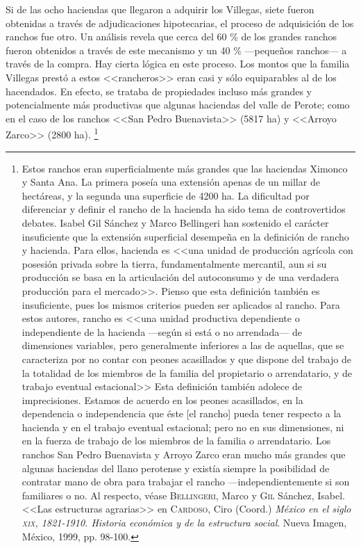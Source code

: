 \documentclass[14pt,twoside,final]{extbook} %
\let\oldfootnote\footnote
\renewcommand\footnote[1]{%
\oldfootnote{\hspace{1mm}#1}}
\begin{document}
Si de las ocho haciendas que llegaron a adquirir los Villegas, siete fueron obtenidas a través de adjudicaciones hipotecarias, el proceso de adquisición de los ranchos fue otro. Un análisis revela que cerca del 60 \% de los grandes ranchos fueron obtenidos a través de este mecanismo y un 40 \% ---pequeños ranchos--- a través de la compra. Hay cierta lógica en este proceso. Los montos que la familia Villegas prestó a estos <<rancheros>> eran casi y sólo equiparables al de los hacendados. En efecto, se trataba de propiedades incluso más grandes y potencialmente más productivas que algunas haciendas del valle de Perote; como en el caso de los ranchos <<San Pedro Buenavista>> (5817 ha) y <<Arroyo Zarco>> (2800 ha).\footnote{Estos ranchos eran superficialmente más grandes que las haciendas Ximonco y Santa Ana. La primera poseía una extensión apenas de un millar de hectáreas, y la segunda una superficie de 4200 ha. La dificultad por diferenciar y definir el rancho de la hacienda ha sido tema de controvertidos debates. Isabel Gil Sánchez y Marco Bellingeri han sostenido el carácter insuficiente que la extensión superficial desempeña en la definición de rancho y hacienda. Para ellos, hacienda es <<una unidad de producción agrícola con posesión privada sobre la tierra, fundamentalmente mercantil, aun si su producción se basa en la articulación del autoconsumo y de una verdadera producción para el mercado>>. Pienso que esta definición también es insuficiente, pues los mismos criterios pueden ser aplicados al rancho. Para estos autores, rancho es <<una unidad productiva dependiente o independiente de la hacienda ---según si está o no arrendada--- de dimensiones variables, pero generalmente inferiores a las de aquellas, que se caracteriza por no contar con peones acasillados y que dispone del trabajo de la totalidad de los miembros de la familia del propietario o arrendatario, y de trabajo eventual estacional>> Esta definición también adolece de imprecisiones. Estamos de acuerdo en los peones acasillados, en la dependencia o independencia que éste [el rancho] pueda tener respecto a la hacienda y en el trabajo eventual estacional; pero no en sus dimensiones, ni en la fuerza de trabajo de los miembros de la familia o arrendatario. Los ranchos San Pedro Buenavista y Arroyo Zarco eran mucho más grandes que algunas haciendas del llano perotense y existía siempre la posibilidad de contratar mano de obra para trabajar el rancho ---independientemente si son familiares o no. Al respecto, véase \textsc{Bellingeri}, Marco y \textsc{Gil} Sánchez, Isabel. <<Las estructuras agrarias>> en \textsc{Cardoso}, Ciro (Coord.) \emph{México en el siglo \textsc{xix}, 1821-1910. Historia económica y de la estructura social}. Nueva Imagen, México, 1999, pp. 98-100.}
\end{document}
